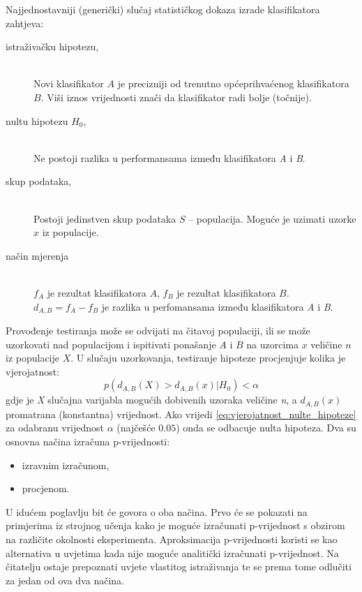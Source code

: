 Najjednostavniji (generički) slučaj statističkog dokaza izrade klasifikatora zahtjeva: 
\begin{description}
  \item[istraživačku hipotezu,] \hfill \\
  Novi klasifikator $A$ je precizniji od trenutno općeprihvaćenog klasifikatora $B$. Viši iznos vrijednosti znači da klasifikator radi bolje (točnije).
  \item[nultu hipotezu $H_0$,] \hfill \\
  Ne postoji razlika u performansama između klasifikatora \textit{A} i \textit{B}.
  \item[skup podataka,] \hfill \\
  Postoji jedinstven skup podataka $S$  -- populacija. Moguće je uzimati uzorke $x$ iz populacije.
  \item[način mjerenja] \hfill \\  
  $f_A$ je rezultat klasifikatora $A$, $f_B$ je rezultat klasifikatora $B$. $d_{A,B}=f_A-f_B$ je razlika u perfomansama između klasifikatora \textit{A} i \textit{B}.
\end{description}
Provođenje testiranja može se odvijati na čitavoj populaciji, ili se može uzorkovati nad populacijom i ispitivati ponašanje $A$ i $B$ na uzorcima $x$ veličine $n$ iz populacije $X$. U slučaju uzorkovanja, testiranje hipoteze procjenjuje kolika je vjerojatnost:
\begin{equation}
\label{eq:vjerojatnost_nulte_hipoteze}
p(d_{A,B}(X) > d_{A,B}(x) | H_{0}) < \alpha
\end{equation}
gdje je \textit{X} slučajna varijabla mogućih dobivenih uzoraka veličine \textit{n}, a $d_{A,B}(x)$ promatrana (konstantna) vrijednost. Ako vrijedi \ref{eq:vjerojatnost_nulte_hipoteze} za odabranu vrijednost $\alpha$ (najčešće $0.05$) onda se odbacuje nulta hipoteza. Dva su osnovna načina izračuna p-vrijednosti:
\begin{itemize}
\item izravnim izračunom,
\item procjenom.
\end{itemize}

U idućem poglavlju bit će govora o oba načina. Prvo će se pokazati na primjerima iz strojnog učenja kako je moguće izračunati p-vrijednost s obzirom na različite okolnosti eksperimenta. Aproksimacija p-vrijednosti koristi se kao alternativa u uvjetima kada nije moguće analitički izračunati p-vrijednost. Na čitatelju ostaje prepoznati uvjete vlastitog istraživanja te se prema tome odlučiti za jedan od ova dva načina.

